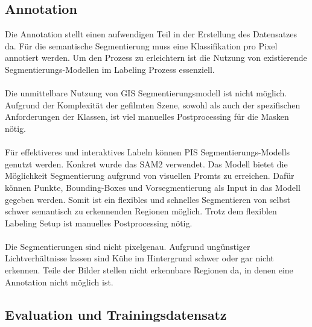 \documentclass[12pt,DIV=15,BCOR=15mm,twoside,headsepline,abstract=true,listof=totoc,bibliography=totoc]{scrreprt}
\theoremstyle{remark}    %
\begin{document}
    \subsection{Annotation}
    Die Annotation stellt einen aufwendigen Teil in der Erstellung des Datensatzes da. Für die semantische Segmentierung muss eine Klassifikation pro Pixel annotiert 
    werden. Um den Prozess zu erleichtern ist die Nutzung von existierende Segmentierungs-Modellen im Labeling Prozess essenziell.\\\\
    Die unmittelbare Nutzung von \ac{GIS} Segmentierungsmodell ist nicht möglich. Aufgrund der Komplexität der gefilmten Szene,
    sowohl als auch der spezifischen Anforderungen der Klassen, ist viel manuelles Postprocessing für die Masken nötig.\\\\
    Für effektiveres und interaktives Labeln können \ac{PIS} Segmentierungs-Modells genutzt werden. Konkret wurde das SAM2 \cite{ravi2024sam2segmentimages} 
    verwendet. Das Modell 
    bietet die Möglichkeit Segmentierung aufgrund von visuellen Promts zu erreichen. Dafür können Punkte, Bounding-Boxes und Vorsegmentierung als Input in 
    das Modell gegeben werden. Somit ist ein flexibles und schnelles Segmentieren von selbst schwer semantisch zu erkennenden Regionen möglich.
    Trotz dem flexiblen Labeling Setup ist manuelles Postprocessing nötig.\\\\
    Die Segmentierungen sind nicht pixelgenau. Aufgrund ungünstiger Lichtverhältnisse lassen sind Kühe im Hintergrund schwer oder gar nicht erkennen. Teile
    der Bilder stellen nicht erkennbare Regionen da, in denen eine Annotation nicht möglich ist.

    \subsection{Evaluation und Trainingsdatensatz}
\end{document}
